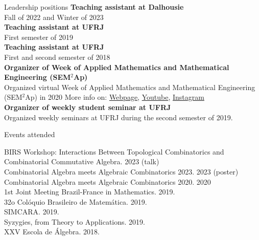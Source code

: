 \documentclass{resume} %
\begin{document}

\begin{rSection}{Leadership positions}
{\bf Teaching assistant at Dalhousie}
\\
Fall of 2022 and Winter of 2023
\\
{\bf Teaching assistant at UFRJ} 
\\
First semester of 2019
\\
{\bf Teaching assistant at UFRJ} 
\\
First and second semester of 2018
\\
{\bf Organizer of Week of Applied Mathematics and Mathematical Engineering (SEM$^2$Ap)}
\\
Organized virtual Week of Applied Mathematics and Mathematical Engineering (SEM$^2$Ap) in 2020
{\scriptsize More info on:  \href{http://semap.rio.br}{Webpage},   \href{https://www.youtube.com/channel/UC14NMQ5cOsSuLrAQGGa2T4Q}{Youtube}, 
\href{https://www.instagram.com/semap.rio/}{Instagram}}
\\
{\bf Organizer of weekly student seminar at UFRJ}
\\
Organized weekly seminars at UFRJ during the second semester of 2019.
\end{rSection}

\clearpage


\begin{rSection}{Events attended}

BIRS Workshop: Interactions Between Topological Combinatorics and Combinatorial Commutative Algebra. 2023 (talk)
\\ Combinatorial Algebra meets Algebraic Combinatorics 2023. 2023 (poster)%
\\ Combinatorial Algebra meets Algebraic Combinatorics 2020. 2020
\\ 1st Joint Meeting Brazil-France in Mathematics. 2019.
\\ 32o Colóquio Brasileiro de Matemática. 2019.
\\ SIMCARA. 2019.
\\ Syzygies, from Theory to Applications. 2019.
\\ XXV Escola de Álgebra. 2018.
\\
\end{rSection}


\end{document}
